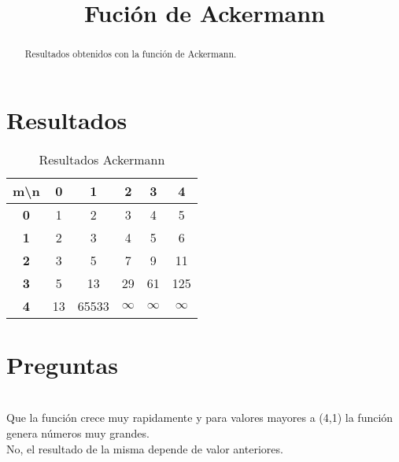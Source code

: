 
\title{Fución de Ackermann}

\maketitle
\begin{abstract}
    Resultados obtenidos con la función de Ackermann.
\end{abstract}
\section{Resultados}

\begin{table}[h]
    \centering
    \begin{tabular}{|c|c|c|c|c|c|}
        \hline
        \textbf{m\textbackslash n} & \textbf{0} & \textbf{1} & \textbf{2} & \textbf{3} & \textbf{4} \\ \hline
        \textbf{0} & 1 & 2 & 3 & 4 & 5 \\ \hline
        \textbf{1} & 2 & 3 & 4 & 5 & 6 \\ \hline
        \textbf{2} & 3 & 5 & 7 & 9 & 11 \\ \hline
        \textbf{3} & 5 & 13 & 29 & 61 & 125 \\ \hline
        \textbf{4} & 13 & 65533 & \textbf{$\infty$} & \textbf{$\infty$} & \textbf{$\infty$} \\ \hline
    \end{tabular}
    \caption{Resultados Ackermann}
    \label{table:Ack}
\end{table}
\section{Preguntas}
\\
Que la función crece muy rapidamente y para valores mayores a (4,1) la función genera números muy grandes.
\\
No, el resultado de la misma depende de valor anteriores.

